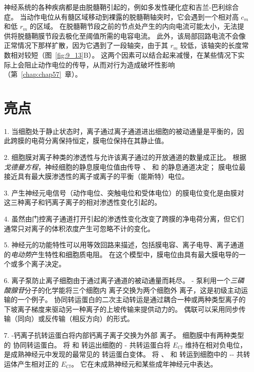 神经系统的各种疾病都是由脱髓鞘引起的，例如多发性硬化症和吉兰-巴利综合症。
当动作电位从有髓区域移动到裸露的脱髓鞘轴突时，它会遇到一个相对高 $c_m$ 和低 $r_m$ 的区域。
在脱髓鞘节段之前的节点处产生的内向电流可能太小，无法提供将脱髓鞘膜节段去极化至阈值所需的电容电流。
此外，该局部回路电流不会像正常情况下那样扩散，因为它遇到了一段轴突，由于其 $r_m$ 较低，该轴突的长度常数相对较短（图~\ref{fig:9_13}B）。
这两个因素可以结合起来减慢，在某些情况下实际上会阻止动作电位的传导，从而对行为造成破坏性影响（第~\ref{chap:chap57}~章）。



\section{亮点}

1. 当细胞处于静止状态时，离子通过离子通道进出细胞的被动通量是平衡的，因此跨膜的电荷分离保持恒定，膜电位保持在其静止值。


2. 细胞膜对离子种类的渗透性与允许该离子通过的开放通道的数量成正比。
根据\textit{戈德曼方程}，神经细胞的静息膜电位值由传导 、 和  的静息通道决定；
膜电位最接近具有最大膜渗透性的离子或离子的平衡（能斯特）电位。 


3. 产生神经元电信号（动作电位、突触电位和受体电位）的膜电位变化是由膜对这三种离子和钙离子离子的相对渗透性变化引起的。 


4. 虽然由门控离子通道打开引起的渗透性变化改变了跨膜的净电荷分离，但它们通常只对离子的体积浓度产生可忽略不计的变化。


5. 神经元的功能特性可以用等效回路来描述，包括膜电容、离子电导、离子通道的\textit{电动势}产生特性和细胞质电阻。
在这个模型中，膜电位由具有最大膜电导的一个或多个离子决定。 


6. 离子泵防止离子细胞由于通过离子通道的被动通量而耗尽。
- 泵利用一个\textit{三磷酸腺苷}分子的化学能将三个细胞内  离子交换为两个细胞外  离子，这是初级主动运输的一个例子。
协同转运蛋白的二次主动转运是通过耦合一种或两种类型离子的下坡离子梯度来驱动另一种离子的上坡传输来提供动力的。
偶联可以采用同步传输（同向）或反传输（相反方向）的形式。 


7. -钙离子抗转运蛋白将内部钙离子离子交换为外部  离子。
细胞膜中有两种类型的  协同转运蛋白。
将  和  转运出细胞的 - 共转运蛋白将 $E_{Cl}$ 维持在相对负电位，是成熟神经元中发现的最常见的  转运蛋白变体。
将 、 和  转运到细胞中的 -- 共转运体产生相对正的 $E_{Cl}$。
它在未成熟神经元和某些成年神经元中表达。 


